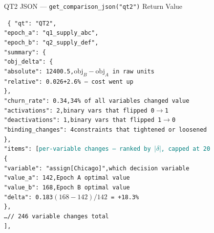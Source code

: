 \documentclass[aspectratio=169,10pt]{beamer}
\begin{document}
\begin{frame}[t]{QT2 JSON — \texttt{get\_comparison\_json("qt2")} Return Value}
\vspace{1pt}
\begin{block}{}
  \texttt{\scriptsize
    \{\,"qt": "QT2",\\
    \quad "epoch\_a": "q1\_supply\_abc",\\
    \quad "epoch\_b": "q2\_supply\_def",\\[1pt]
    \quad "summary": \{\\
    \quad\quad "obj\_delta": \{\\
    \quad\quad\quad "absolute": 12400.5,\hfill\textcolor{pblue}{\tiny $\text{obj}_B - \text{obj}_A$ in raw units}\\
    \quad\quad\quad "relative": 0.026\hfill\textcolor{pblue}{\tiny +2.6\% — cost went up}\\
    \quad\quad \},\\
    \quad\quad "churn\_rate": 0.34,\hfill\textcolor{aorng}{\tiny 34\% of all variables changed value}\\
    \quad\quad "activations": 2,\hfill\textcolor{purp}{\tiny binary vars that flipped 0$\to$1}\\
    \quad\quad "deactivations": 1,\hfill\textcolor{purp}{\tiny binary vars that flipped 1$\to$0}\\
    \quad\quad "binding\_changes": 4\hfill\textcolor{mgray}{\tiny constraints that tightened or loosened}\\
    \quad \},\\[1pt]
    \quad "items": [\hfill\textcolor{teal}{\tiny per-variable changes — ranked by $|\delta|$, capped at 20}\\
    \quad\quad \{\\
    \quad\quad\quad "variable": "assign[Chicago]",\hfill\textcolor{mgray}{\tiny which decision variable}\\
    \quad\quad\quad "value\_a": 142,\hfill\textcolor{mgray}{\tiny Epoch A optimal value}\\
    \quad\quad\quad "value\_b": 168,\hfill\textcolor{mgray}{\tiny Epoch B optimal value}\\
    \quad\quad\quad "delta": 0.183\hfill\textcolor{pblue}{\tiny $(168-142)/142$ = +18.3\%}\\
    \quad\quad \},\\
    \quad\quad \ldots\quad\textcolor{mgray}{// 246 variable changes total}\\
    \quad ],\\
}
\end{block}
\end{frame}
\end{document}
